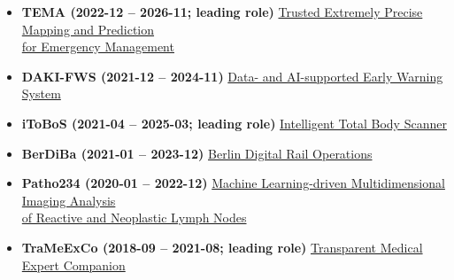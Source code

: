 
\begin{itemize}
    \item [] \textbf{TEMA (2022-12 -- 2026-11; leading role)}
    \href{https://www.hhi.fraunhofer.de/en/departments/ai/projects/tema.html}{Trusted Extremely Precise Mapping and Prediction\\
    \vphantom{}\qquad for Emergency Management}

    \item [] \textbf{DAKI-FWS (2021-12 -- 2024-11)}
    \href{https://www.hhi.fraunhofer.de/en/departments/ai/projects/daki-fws.html}{Data- and AI-supported Early Warning System}
    
    \item [] \textbf{iToBoS (2021-04 -- 2025-03; leading role)}
    \href{https://www.hhi.fraunhofer.de/en/departments/ai/projects/itobos.html}{Intelligent Total Body Scanner}

    \item [] \textbf{BerDiBa (2021-01 -- 2023-12)}
    \href{https://www.hhi.fraunhofer.de/en/departments/ai/projects/berdiba.html}{Berlin Digital Rail Operations}

    \item [] \textbf{Patho234 (2020-01 -- 2022-12)}
    \href{https://www.hhi.fraunhofer.de/en/departments/ai/projects/patho234.html}{Machine Learning-driven Multidimensional Imaging Analysis\\
    \vphantom{}\qquad of Reactive  and Neoplastic Lymph Nodes}

    \item [] \textbf{TraMeExCo (2018-09 -- 2021-08; leading role)}
    \href{https://www.hhi.fraunhofer.de/en/departments/ai/projects/trameexco.html}{Transparent Medical Expert Companion}
\end{itemize}
